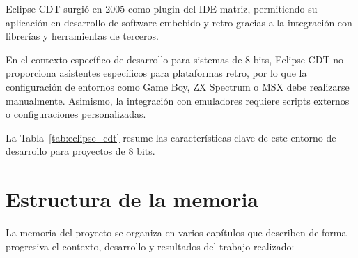 \documentclass[../../main.tex]{subfiles}
\begin{document}
\par{Eclipse CDT surgió en 2005 como plugin del IDE matriz, permitiendo su aplicación en desarrollo de software embebido y retro gracias a la integración con librerías y herramientas de terceros.}


\par{En el contexto específico de desarrollo para sistemas de 8 bits, Eclipse CDT no proporciona asistentes específicos para plataformas retro, por lo que la configuración de entornos como Game Boy, ZX Spectrum o MSX debe realizarse manualmente. Asimismo, la integración con emuladores requiere scripts externos o configuraciones personalizadas.}

\par{La Tabla~\ref{tab:eclipse_cdt} resume las características clave de este entorno de desarrollo para proyectos de 8 bits.}

\begin{table}[!h]
    
    \centering
    \tiny
    \caption{Características clave de Eclipse CDT para desarrollo en 8 bits}
    \label{tab:eclipse_cdt}
\end{table}


\clearpage

\section{Estructura de la memoria}
\label{S:estructura_memoria}

La memoria del proyecto se organiza en varios capítulos que describen de forma progresiva el contexto, desarrollo y resultados del trabajo realizado:
\end{document}
